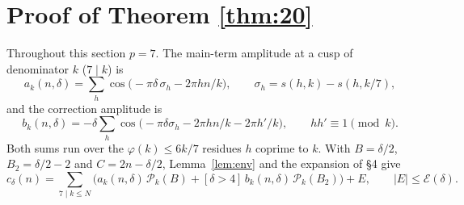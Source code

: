 \documentclass[11pt]{amsart}
\theoremstyle{remark}
\theoremstyle{definition}
\newcommand{\cP}{\mathcal P}
\newcommand{\cE}{\mathcal E}
\begin{document}
\section{Proof of Theorem \ref{thm:20}}\label{sec:20}
Throughout this section $p=7$. The main-term amplitude at a cusp of denominator $k$ ($7\mid k$) is
\[
a_k(n,\delta)=\sum_{h}\cos\big(-\pi\delta\,\sigma_h-2\pi hn/k\big),\qquad \sigma_h=s(h,k)-s(h,k/7),
\]
and the correction amplitude is
\[
b_k(n,\delta)=-\delta\sum_h\cos\big(-\pi\delta\sigma_h-2\pi hn/k-2\pi h'/k\big),\qquad hh'\equiv1\pmod k .
\]
Both sums run over the $\varphi(k)\le 6k/7$ residues $h$ coprime to $k$. With $B=\delta/2$, $B_2=\delta/2-2$ and $C=2n-\delta/2$, Lemma~\ref{lem:env} and the expansion of \S4 give
\begin{equation}\label{eq:G7exp}
c_\delta(n)=\sum_{7\mid k\le N}\Big(a_k(n,\delta)\,\cP_k(B)+[\delta>4]\,b_k(n,\delta)\,\cP_k(B_2)\Big)+E,\qquad |E|\le\cE(\delta).
\end{equation}
\end{document}
